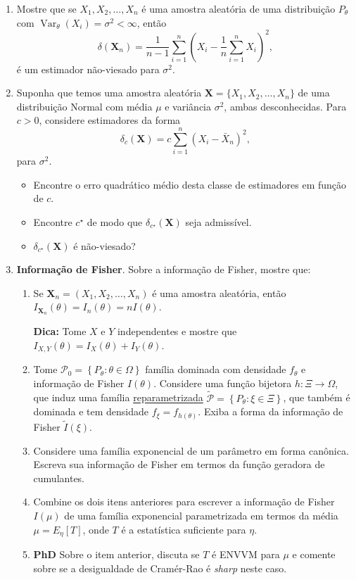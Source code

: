 \documentclass[a4paper,10pt, notitlepage]{report}
\newcommand{\vr}{\operatorname{Var}} %
\newcommand{\rs}{X_1, X_2, \ldots, X_n} %
\newcommand{\bX}{\boldsymbol{X}} %
\begin{document}
\begin{enumerate}
\item Mostre que se $\rs$ é uma amostra aleatória de uma distribuição $P_\theta$ com $\vr_\theta(X_i) = \sigma^2 < \infty$, então
$$\delta(\bX_n) = \frac{1}{n-1} \sum_{i=1}^n \left(X_i - \frac{1}{n}\sum_{i=1}^n X_i\right)^2,$$
é um estimador não-viesado para $\sigma^2$.
\item Suponha que temos uma amostra aleatória $\bX = \{ \rs \}$ de uma distribuição Normal com média $\mu$ e variância $\sigma^2$, ambas desconhecidas.
 Para $c>0$, considere estimadores da forma
\begin{equation}
 \delta_c(\bX) = c\sum_{i=1}^n \left(X_i - \bar{X}_n\right)^2,
\end{equation}
para $\sigma^2$.
\begin{itemize}
 \item Encontre o erro quadrático médio desta classe de estimadores em função de $c$. 
 \item Encontre $c^\star$ de modo que $\delta_{c^\star}(\bX)$ seja admissível.
 \item $\delta_{c^\star}(\bX)$ é não-viesado?
\end{itemize}
\item \textbf{Informação de Fisher}. Sobre a informação de Fisher, mostre que:
\begin{enumerate}
    \item Se $\bX_n = (\rs)$ é uma amostra aleatória, então $I_{\bX_n}(\theta) = I_n(\theta) = n I(\theta)$.
    
    \textbf{Dica:} Tome $X$ e $Y$ independentes e mostre que $I_{X,Y}(\theta) = I_X(\theta) + I_Y(\theta)$.
    \item Tome $\mathcal{P}_0 = \left\{P_\theta : \theta \in \Omega\right\}$ família dominada com densidade $f_\theta$ e informação de Fisher $I(\theta)$.
    Considere uma função bijetora $h : \Xi \to \Omega$, que induz uma família \underline{reparametrizada} $\tilde{\mathcal{P}} = \left\{P_\theta : \xi \in \Xi \right\}$, que também é dominada e tem densidade $f_\xi = f_{h(\theta)}$.
    Exiba a forma da informação de Fisher $\tilde{I}(\xi)$.
    \item Considere uma família exponencial de um parâmetro em forma canônica. 
    Escreva sua informação de Fisher em termos da função geradora de cumulantes.
    \item Combine os dois itens anteriores para escrever a informação de Fisher $I(\mu)$ de uma família exponencial parametrizada em termos da média $\mu = E_\eta[T]$, onde $T$ é a estatística suficiente para $\eta$.
    \item \textbf{PhD} Sobre o item anterior, discuta se $T$ é ENVVM para $\mu$ e comente sobre se a desigualdade de Cramér-Rao é \textit{sharp} neste caso.


\end{enumerate}
\end{enumerate}
\end{document}
